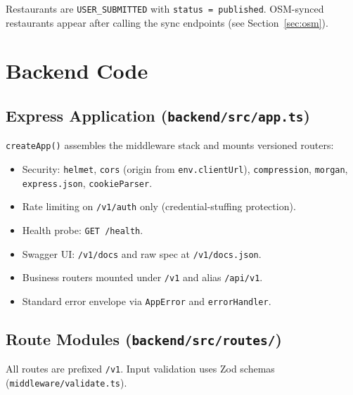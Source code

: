 \documentclass[11pt,a4paper]{article}
\begin{document}
Restaurants are \texttt{USER\_SUBMITTED} with \texttt{status = published}.
OSM-synced restaurants appear after calling the sync endpoints (see Section~\ref{sec:osm}).

\section{Backend Code}

\subsection{Express Application (\texttt{backend/src/app.ts})}

\texttt{createApp()} assembles the middleware stack and mounts versioned routers:

\begin{itemize}
  \item Security: \texttt{helmet}, \texttt{cors} (origin from \texttt{env.clientUrl}),
        \texttt{compression}, \texttt{morgan}, \texttt{express.json}, \texttt{cookieParser}.
  \item Rate limiting on \texttt{/v1/auth} only (credential-stuffing protection).
  \item Health probe: \texttt{GET /health}.
  \item Swagger UI: \texttt{/v1/docs} and raw spec at \texttt{/v1/docs.json}.
  \item Business routers mounted under \texttt{/v1} and alias \texttt{/api/v1}.
  \item Standard error envelope via \texttt{AppError} and \texttt{errorHandler}.
\end{itemize}

\subsection{Route Modules (\texttt{backend/src/routes/})}

All routes are prefixed \texttt{/v1}. Input validation uses Zod schemas
(\texttt{middleware/validate.ts}).
\end{document}
